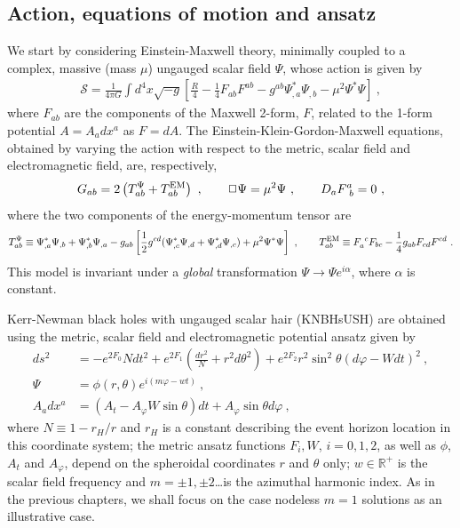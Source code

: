 \subsection{Action, equations of motion and ansatz}
\label{sec_mofrl}
We start by considering Einstein-Maxwell theory, minimally coupled to a complex, massive (mass $\mu$)  ungauged scalar field $\Psi$, whose action is given by
%
\begin{eqnarray}
  \label{KNaction}
 \mathcal{S} = \frac{1}{4\pi G}\int d^4x \sqrt{-g}\left[\frac{R}{4}- \frac{1}{4}F_{ab}F^{ab}- g^{ab}\Psi^*_{,a}\Psi_{,b} -\mu^2\Psi^*\Psi \right]\ ,  
\end{eqnarray}  
where $F_{ab}$ are the components of the Maxwell 2-form, $F$, related to the 1-form potential $A=A_adx^a$ as $F=dA$. The Einstein-Klein-Gordon-Maxwell equations, obtained by varying the action with respect to the metric, scalar field and electromagnetic field, are, respectively,
%
%
\begin{equation}
G_{ab}  = 2\left( T_{ab}^\Psi+T_{ab} ^{\rm EM} \right)\ , \qquad \Box \Psi =\mu^2\Psi \ , \qquad D_aF^a_{~b}=0 \ ,
\label{KNeom}
\end{equation}
where the two components of the energy-momentum tensor are
%
\begin{equation}
\label{KNemt}
T_{ab}^\Psi \equiv  
 \Psi_{ , a}^*\Psi_{,b}
+\Psi_{,b}^*\Psi_{,a} 
-g_{ab}  \left[ \frac{1}{2} g^{cd} 
 ( \Psi_{,c}^*\Psi_{,d}+
\Psi_{,d}^*\Psi_{,c} )+\mu^2 \Psi^*\Psi\right] \ , \qquad
 T_{ab}^{\rm EM} \equiv F_a^{~c}F_{bc} - \frac{1}{4}g_{ab}F_{cd}F^{cd} \ .
\end{equation}
This model is invariant under a \textit{global} transformation $\Psi\rightarrow \Psi e^{i\alpha}$, where $\alpha$ is constant.



Kerr-Newman black holes with ungauged scalar hair (KNBHsUSH) are obtained using the metric, scalar field and electromagnetic potential ansatz given by
%
\begin{align}
  \label{metric_ansatz}
  ds^2 &= -e^{2F_0}Ndt^2 + e^{2F_1}\left( \frac{dr^2}{N} + r^2d\theta^2 \right) + e^{2F_2}r^2\sin^2\theta \left(d\varphi - Wdt \right)^2 \ ,\\
\label{scalar_ansatz}
\Psi &= \phi(r,\theta)e^{i(m\varphi-w t)}~, \\
 \label{electric_ansatz}
 A_adx^a &= \left( A_t - A_\varphi W\sin\theta \right)dt + A_\varphi\sin\theta d\varphi \ ,
\end{align}
where $N\equiv 1-r_H/r$ and $r_H$ is a constant describing the event horizon location in this coordinate system; the metric ansatz functions $F_i,W$, $i=0,1,2$, as well as $\phi$, $A_t$ and $A_\varphi$, depend on the spheroidal coordinates $r$ and $\theta$ only; $w\in \mathbb{R}^+$ is the scalar field frequency and $m=\pm 1,\pm 2$\dots is the azimuthal harmonic index.
As in the previous chapters, we shall focus on the case nodeless $m=1$ solutions as an illustrative case.

